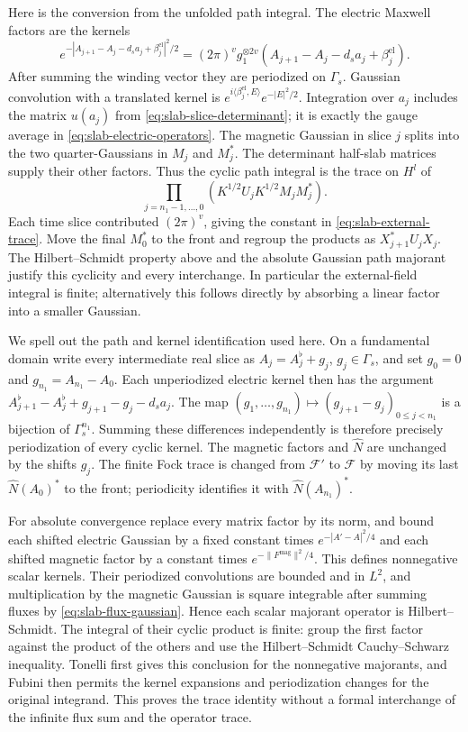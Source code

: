 \documentclass[11pt,letterpaper,reqno]{amsart}
\begin{document}
Here is the conversion from the unfolded path integral. The electric
Maxwell factors are the kernels
\[
 e^{-|A_{j+1}-A_j-d_sa_j+\beta_j^{\mathrm{el}}|^2/2}
       =(2\pi)^v g_1^{\otimes 2v}
                       (A_{j+1}-A_j-d_sa_j+\beta_j^{\mathrm{el}}).
\]
After summing the winding vector they are periodized on $\Gamma_s$.
Gaussian convolution with a translated kernel is
$e^{i\langle\beta_j^{\mathrm{el}},E\rangle}e^{-|E|^2/2}$.
Integration over $a_j$ includes the matrix $u(a_j)$ from
\eqref{eq:slab-slice-determinant}; it is exactly the gauge average in
\eqref{eq:slab-electric-operators}. The magnetic Gaussian in slice
$j$ splits into the two quarter-Gaussians in $M_j$ and $M_j^*$.
The determinant half-slab matrices supply their other factors.
Thus the cyclic path integral is the trace on $H^l$ of
\[
 \prod_{j=n_1-1,\ldots,0}
       (K^{1/2}U_jK^{1/2}M_jM_j^*).
\]
Each time slice contributed $(2\pi)^v$, giving the constant in
\eqref{eq:slab-external-trace}. Move the final $M_0^*$ to the front
and regroup the products as $X_{j+1}^*U_jX_j$. The
Hilbert--Schmidt property above and the absolute Gaussian path
majorant justify this cyclicity and every interchange. In particular
the external-field integral is finite; alternatively this follows
directly by absorbing a linear factor into a smaller Gaussian.

We spell out the path and kernel identification used here. On a
fundamental domain write every intermediate real slice as
$A_j=A_j^\flat+g_j$, $g_j\in\Gamma_s$, and set $g_0=0$ and
$g_{n_1}=A_{n_1}-A_0$. Each unperiodized electric kernel then has
the argument
$A_{j+1}^\flat-A_j^\flat+g_{j+1}-g_j-d_sa_j$.
The map $(g_1,\ldots,g_{n_1})\mapsto
(g_{j+1}-g_j)_{0\le j<n_1}$ is a bijection of $\Gamma_s^{n_1}$.
Summing these differences independently is therefore precisely
periodization of every cyclic kernel. The magnetic factors and
$\widehat N$ are unchanged by the shifts $g_j$. The finite Fock trace
is changed from $\mathcal F'$ to $\mathcal F$ by moving its last
$\widehat N(A_0)^*$ to the front; periodicity identifies it with
$\widehat N(A_{n_1})^*$.

For absolute convergence replace every matrix factor by its norm,
and bound each shifted electric Gaussian by a fixed constant times
$e^{-|A'-A|^2/4}$ and each shifted magnetic factor by a constant
times $e^{-\|F^{\mathrm{mag}}\|^2/4}$. This defines nonnegative
scalar kernels. Their periodized convolutions are bounded and in
$L^2$, and multiplication by the magnetic Gaussian is square
integrable after summing fluxes by \eqref{eq:slab-flux-gaussian}.
Hence each scalar majorant operator is Hilbert--Schmidt. The
integral of their cyclic product is finite: group the first factor
against the product of the others and use the Hilbert--Schmidt
Cauchy--Schwarz inequality. Tonelli first gives this conclusion
for the nonnegative majorants, and Fubini then permits the kernel
expansions and periodization changes for the original integrand.
This proves the trace identity without a formal interchange of
the infinite flux sum and the operator trace.
\end{document}
